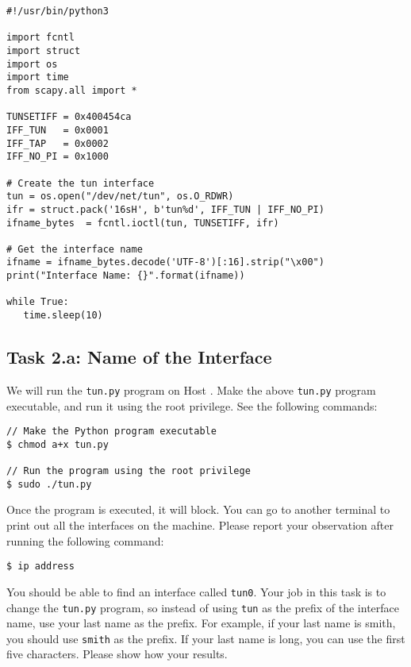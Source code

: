 \begin{lstlisting}[caption={Creating a TUN interface (\texttt{tun.py})}, label=vpn:list:create_tun]
#!/usr/bin/python3

import fcntl
import struct
import os
import time
from scapy.all import *

TUNSETIFF = 0x400454ca
IFF_TUN   = 0x0001
IFF_TAP   = 0x0002
IFF_NO_PI = 0x1000

# Create the tun interface
tun = os.open("/dev/net/tun", os.O_RDWR)
ifr = struct.pack('16sH', b'tun%d', IFF_TUN | IFF_NO_PI)
ifname_bytes  = fcntl.ioctl(tun, TUNSETIFF, ifr)

# Get the interface name
ifname = ifname_bytes.decode('UTF-8')[:16].strip("\x00")
print("Interface Name: {}".format(ifname))

while True:
   time.sleep(10)
\end{lstlisting}
 


\subsection{Task 2.a: Name of the Interface} 

We will run the \texttt{tun.py} program on Host \hostu.  
Make the above \texttt{tun.py} program executable, and run it using the 
root privilege. See the following commands: 

\begin{lstlisting}
// Make the Python program executable 
$ chmod a+x tun.py

// Run the program using the root privilege
$ sudo ./tun.py
\end{lstlisting}
 

Once the program is executed, it will block. You can go to 
another terminal to print out all the interfaces on the machine. Please 
report your observation after running the following command:

\begin{lstlisting}
$ ip address
\end{lstlisting}
 

You should be able to find an interface called \texttt{tun0}. Your job 
in this task is to change the \texttt{tun.py} program, so 
instead of using \texttt{tun}  as the prefix of the interface name, use
your last name as the prefix. For example, if your last name is smith, 
you should use \texttt{smith} as the prefix.  If your last name is long,
you can use the first five characters. Please show how your results. 
 


